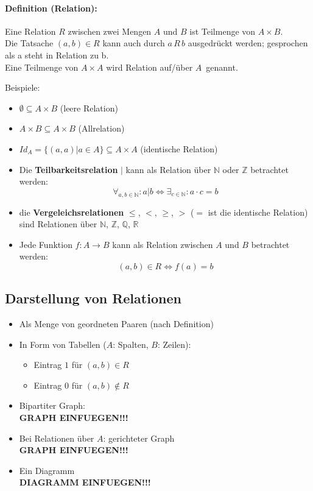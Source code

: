 \documentclass[10pt,a4paper]{article}
\begin{document}
\paragraph{Definition (Relation):}Eine Relation $R$ zwischen zwei Mengen $A$ und $B$ ist Teilmenge von $A\times B$.\\
Die Tatsache $(a,b)\in R$ kann auch durch $a\,R\,b$ ausgedrückt werden; gesprochen als \glqq a steht in Relation zu b\grqq .\\
Eine Teilmenge von $A\times A$ wird \glqq Relation auf/über $A$\grqq\ genannt.

Beispiele:
\begin{itemize}
\item $\emptyset \subseteq A\times B$ (leere Relation)
\item $A\times B \subseteq A\times B$ (Allrelation)
\item $Id_A = \{(a,a) | a\in A\} \subseteq A\times A$ (identische Relation)
\item Die \textbf{Teilbarkeitsrelation} $\mid$ kann als Relation über $\mathbb{N}$ oder $\mathbb{Z}$ betrachtet werden:
\[
\forall_{a,b\in\mathbb{N}}: a|b \Leftrightarrow \exists_{c\in\mathbb{N}}: a\cdot c = b
\]
\item die \textbf{Vergeleichsrelationen} $\leq$, $<$, $\geq$, $>$ ($=$ ist die identische Relation) sind Relationen über $\mathbb{N}$, $\mathbb{Z}$, $\mathbb{Q}$, $\mathbb{R}$
\item Jede Funktion $f:A\rightarrow B$ kann als Relation zwischen $A$ und $B$ betrachtet werden:
\[
(a,b)\in R \Leftrightarrow f(a)=b
\]
\end{itemize}

\subsection{Darstellung von Relationen}
\begin{itemize}
\item Als Menge von geordneten Paaren (nach Definition)
\item In Form von Tabellen ($A$: Spalten, $B$: Zeilen):
\begin{itemize}
\item Eintrag $1$ für $(a,b)\in R$
\item Eintrag $0$ für $(a,b)\not\in R$
\end{itemize}
\item Bipartiter Graph:\\
\textbf{GRAPH EINFUEGEN!!!}
\item Bei Relationen über $A$: gerichteter Graph\\
\textbf{GRAPH EINFUEGEN!!!}
\item Ein Diagramm\\
\textbf{DIAGRAMM EINFUEGEN!!!}
\end{itemize}
\end{document}
